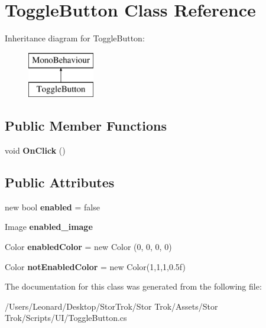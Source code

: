 \hypertarget{class_toggle_button}{}\section{Toggle\+Button Class Reference}
\label{class_toggle_button}
Inheritance diagram for Toggle\+Button\+:\begin{figure}[H]
\begin{center}
\leavevmode
\includegraphics[height=2.000000cm]{class_toggle_button}
\end{center}
\end{figure}
\subsection*{Public Member Functions}
\begin{DoxyCompactItemize}
\item 
\mbox{\label{class_toggle_button_a2db94e434106aa43d7d44458cb32318f}} 
void {\bfseries On\+Click} ()
\end{DoxyCompactItemize}
\subsection*{Public Attributes}
\begin{DoxyCompactItemize}
\item 
\mbox{\label{class_toggle_button_ae8de536422885b344cbaf41fa404c775}} 
new bool {\bfseries enabled} = false
\item 
\mbox{\label{class_toggle_button_a79ea9c596450010441f0567593dfa8c4}} 
Image {\bfseries enabled\+\_\+image}
\item 
\mbox{\label{class_toggle_button_a5d2d0a4224b5711ac66dc18ccaa95409}} 
Color {\bfseries enabled\+Color} = new Color (0, 0, 0, 0)
\item 
\mbox{\label{class_toggle_button_ac4394adcda30b3dc46ee0a54d6c57ebd}} 
Color {\bfseries not\+Enabled\+Color} = new Color(1,1,1,0.\+5f)
\end{DoxyCompactItemize}


The documentation for this class was generated from the following file\+:\begin{DoxyCompactItemize}
\item 
/\+Users/\+Leonard/\+Desktop/\+Stor\+Trok/\+Stor Trok/\+Assets/\+Stor Trok/\+Scripts/\+U\+I/Toggle\+Button.\+cs\end{DoxyCompactItemize}
